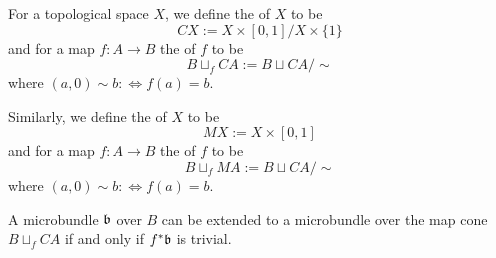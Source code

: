 
\begin{myparagraph}
    For a topological space $X$, we define the  of $X$ to be 
    \[ CX := X \times [0, 1] / X \times \{1\} \]
    and for a map $f: A \to B$ the  of $f$ to be
    \[ B \sqcup_f CA := B \sqcup CA / \sim \]
    where $(a, 0) \sim b :\iff f(a) = b$.
    
    Similarly, we define the  of $X$ to be
    \[ MX := X \times [0, 1] \]
    and for a map $f: A \to B$ the  of $f$ to be
    \[ B \sqcup_f MA := B \sqcup CA / \sim \]
    where $(a, 0) \sim b :\iff f(a) = b$.
\end{myparagraph}

\begin{mylemma}
    A microbundle $\mathfrak{b}$ over $B$ can be extended to a microbundle over the map cone $B \sqcup_f CA$ if and only if $f^*\mathfrak{b}$ is trivial.
\end{mylemma}
